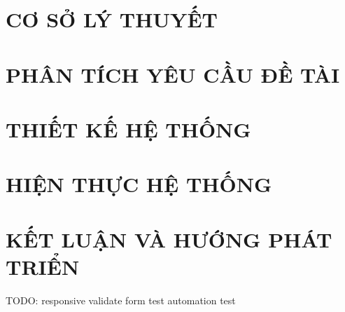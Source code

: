 \documentclass[12pt, a4paper]{report}
\begin{document}
\chapter{\textbf{CƠ SỞ LÝ THUYẾT}}
\newpage

\newpage
\chapter{\textbf{PHÂN TÍCH YÊU CẦU ĐỀ TÀI}}
\newpage

\newpage
\chapter{\textbf{THIẾT KẾ HỆ THỐNG}}
\newpage

\newpage
\chapter{\textbf{HIỆN THỰC HỆ THỐNG}}
\newpage

\newpage
\chapter{\textbf{KẾT LUẬN VÀ HƯỚNG PHÁT TRIỂN}}
\newpage



TODO: responsive
validate form
test
automation test
\end{document}
